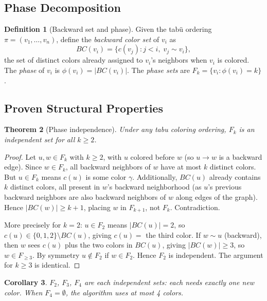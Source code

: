 \documentclass[12pt,letterpaper]{article}
\theoremstyle{plain}
\newtheorem{theorem}{Theorem}[section]
\newtheorem{corollary}[theorem]{Corollary}
\theoremstyle{definition}
\newtheorem{definition}[theorem]{Definition}
\theoremstyle{remark}
\begin{document}
\subsection{Phase Decomposition}

\begin{definition}[Backward set and phase]
Given the tab\"{u} ordering $\pi = (v_1, \ldots, v_n)$, define the
\emph{backward color set} of $v_i$ as
\[
    BC(v_i) = \bigl\{c(v_j) : j < i,\; v_j \sim v_i\bigr\},
\]
the set of distinct colors already assigned to $v_i$'s neighbors when $v_i$ is
colored. The \emph{phase} of $v_i$ is $\phi(v_i) = |BC(v_i)|$.
The \emph{phase sets} are $F_k = \{v_i : \phi(v_i) = k\}$.
\end{definition}

\subsection{Proven Structural Properties}

\begin{theorem}[Phase independence]
\label{thm:phase-indep}
Under any tabu coloring ordering, $F_k$ is an independent set for all $k \geq 2$.
\end{theorem}

\begin{proof}
Let $u, w \in F_k$ with $k \geq 2$, with $u$ colored before $w$ (so $u \to w$
is a backward edge). Since $w \in F_k$, all backward neighbors of $w$ have at
most $k$ distinct colors. But $u \in F_k$ means $c(u)$ is some color $\gamma$.
Additionally, $BC(u)$ already contains $k$ distinct colors, all present in
$w$'s backward neighborhood (as $u$'s previous backward neighbors are also
backward neighbors of $w$ along edges of the graph). Hence $|BC(w)| \geq k+1$,
placing $w$ in $F_{k+1}$, not $F_k$. Contradiction.

More precisely for $k=2$: $u \in F_2$ means $|BC(u)| = 2$, so $c(u) \in
\{0,1,2\} \setminus BC(u)$, giving $c(u) = $ the third color. If $w \sim u$
(backward), then $w$ sees $c(u)$ plus the two colors in $BC(u)$, giving
$|BC(w)| \geq 3$, so $w \in F_{\geq 3}$. By symmetry $u \notin F_2$ if $w \in
F_2$. Hence $F_2$ is independent. The argument for $k \geq 3$ is identical.
\end{proof}

\begin{corollary}
$F_2$, $F_3$, $F_4$ are each independent sets: each needs exactly one new
color. When $F_4 = \emptyset$, the algorithm uses at most 4 colors.
\end{corollary}
\end{document}
